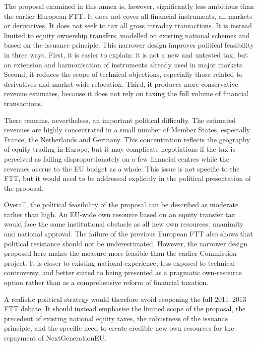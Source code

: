 \documentclass[../main]{subfiles}
\begin{document}
The proposal examined in this annex is, however, significantly less ambitious than the earlier European FTT. It does not cover all financial instruments, all markets or derivatives. It does not seek to tax all gross intraday transactions. It is instead limited to equity ownership transfers, modelled on existing national schemes and based on the issuance principle. This narrower design improves political feasibility in three ways. First, it is easier to explain: it is not a new and untested tax, but an extension and harmonisation of instruments already used in major markets. Second, it reduces the scope of technical objections, especially those related to derivatives and market-wide relocation. Third, it produces more conservative revenue estimates, because it does not rely on taxing the full volume of financial transactions.

There remains, nevertheless, an important political difficulty. The estimated revenues are highly concentrated in a small number of Member States, especially France, the Netherlands and Germany. This concentration reflects the geography of equity trading in Europe, but it may complicate negotiations if the tax is perceived as falling disproportionately on a few financial centres while the revenues accrue to the EU budget as a whole. This issue is not specific to the FTT, but it would need to be addressed explicitly in the political presentation of the proposal.

Overall, the political feasibility of the proposal can be described as moderate rather than high. An EU-wide own resource based on an equity transfer tax would face the same institutional obstacle as all new own resources: unanimity and national approval. The failure of the previous European FTT also shows that political resistance should not be underestimated. However, the narrower design proposed here makes the measure more feasible than the earlier Commission project. It is closer to existing national experience, less exposed to technical controversy, and better suited to being presented as a pragmatic own-resource option rather than as a comprehensive reform of financial taxation.

A realistic political strategy would therefore avoid reopening the full 2011--2013 FTT debate. It should instead emphasise the limited scope of the proposal, the precedent of existing national equity taxes, the robustness of the issuance principle, and the specific need to create credible new own resources for the repayment of NextGenerationEU.
\end{document}
